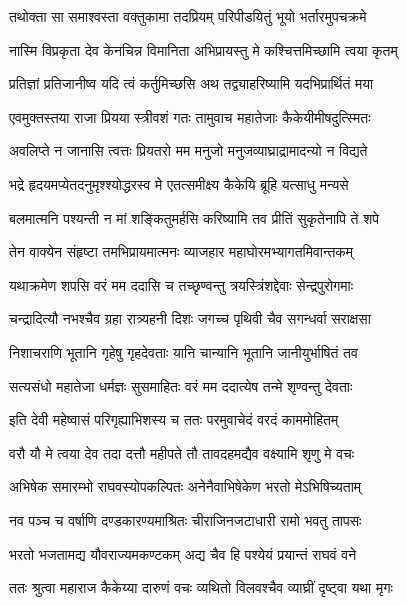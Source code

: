 \twolineshloka
{तथोक्ता सा समाश्वस्ता वक्तुकामा तदप्रियम्}
{परिपीडयितुं भूयो भर्तारमुपचक्रमे} %

\twolineshloka
{नास्मि विप्रकृता देव केनचिन्न विमानिता}
{अभिप्रायस्तु मे कश्चित्तमिच्छामि त्वया कृतम्} %

\twolineshloka
{प्रतिज्ञां प्रतिजानीष्व यदि त्वं कर्तुमिच्छसि}
{अथ तद्व्याहरिष्यामि यदभिप्रार्थितं मया} %

\twolineshloka
{एवमुक्तस्तया राजा प्रियया स्त्रीवशं गतः}
{तामुवाच महातेजाः कैकेयीमीषदुत्स्मितः} %

\twolineshloka
{अवलिप्ते न जानासि त्वत्तः प्रियतरो मम}
{मनुजो मनुजव्याघ्राद्रामादन्यो न विद्यते} %

\twolineshloka
{भद्रे हृदयमप्येतदनुमृश्श्योद्धरस्व मे}
{एतत्समीक्ष्य कैकेयि ब्रूहि यत्साधु मन्यसे} %

\twolineshloka
{बलमात्मनि पश्यन्ती न मां शङ्कितुमर्हसि}
{करिष्यामि तव प्रीतिं सुकृतेनापि ते शपे} %

\twolineshloka
{तेन वाक्येन संहृष्टा तमभिप्रायमात्मनः}
{व्याजहार महाघोरमभ्यागतमिवान्तकम्} %

\twolineshloka
{यथाक्रमेण शपसि वरं मम ददासि च}
{तच्छृण्वन्तु त्रयस्त्रिंशद्देवाः सेन्द्रपुरोगमाः} %

\twolineshloka
{चन्द्रादित्यौ नभश्चैव ग्रहा रात्र्यहनी दिशः}
{जगच्च पृथिवी चैव सगन्धर्वा सराक्षसा} %

\twolineshloka
{निशाचराणि भूतानि गृहेषु गृहदेवताः}
{यानि चान्यानि भूतानि जानीयुर्भाषितं तव} %

\twolineshloka
{सत्यसंधो महातेजा धर्मज्ञः सुसमाहितः}
{वरं मम ददात्येष तन्मे शृण्वन्तु देवताः} %

\twolineshloka
{इति देवी महेष्वासं परिगृह्याभिशस्य च}
{ततः परमुवाचेदं वरदं काममोहितम्} %

\twolineshloka
{वरौ यौ मे त्वया देव तदा दत्तौ महीपते}
{तौ तावदहमद्यैव वक्ष्यामि शृणु मे वचः} %

\twolineshloka
{अभिषेक समारम्भो राघवस्योपकल्पितः}
{अनेनैवाभिषेकेण भरतो मेऽभिषिच्यताम्} %

\twolineshloka
{नव पञ्च च वर्षाणि दण्डकारण्यमाश्रितः}
{चीराजिनजटाधारी रामो भवतु तापसः} %

\twolineshloka
{भरतो भजतामद्य यौवराज्यमकण्टकम्}
{अद्य चैव हि पश्येयं प्रयान्तं राघवं वने} %

\twolineshloka
{ततः श्रुत्वा महाराज कैकेय्या दारुणं वचः}
{व्यथितो विलवश्चैव व्याघ्रीं दृष्ट्वा यथा मृगः} %


